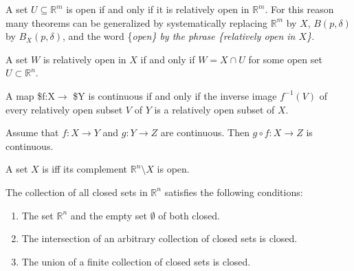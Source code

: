\documentclass[10pt,a4paper,UTF8]{article}
\begin{document}
A set \(U\subseteq\mathbb{R}^m\) is open if and only if it is relatively open in \(\mathbb{R}^m\).
For this reason many theorems can be generalized by systematically replacing \(\mathbb{R}^m\) by \(X\), \(B(p,\delta)\) by \(B_X(p,\delta)\), and the word \{\em open\} by the phrase \{\em relatively open in \(X\)\}.

\begin{tikztheorem}
A set \(W\) is relatively open in \(X\) if and only if \(W=X\cap U\) for some  open set \(U\subset \mathbb{R}^n\).
\end{tikztheorem}

\begin{tikztheorem}
A map \$f:X\(\to\) \$Y is continuous if and only if the inverse image \(f^{-1}(V)\) of every relatively open subset \(V\) of \(Y\) is a relatively open subset of \(X\).
\end{tikztheorem}

\begin{tikztheorem}
Assume that \(f:X\to Y\) and \(g:Y\to Z\) are continuous. Then \(g\circ f:X\to Z\) is continuous.
\end{tikztheorem}

\begin{definition}
A set \(X\) is  iff its complement \(\mathbb{R}^n\setminus X\) is open.
\end{definition}

\begin{tikztheorem}
The collection of all closed sets in \(\mathbb{R}^n\) satisfies the following conditions:
\begin{enumerate}
\item The  set  \(\mathbb{R}^n\) and the empty set \(\emptyset\) of both closed.
\item The intersection of an arbitrary collection of closed sets is closed.
\item The union of a finite collection of closed sets is closed.
\end{enumerate}
\end{tikztheorem}
\end{document}
